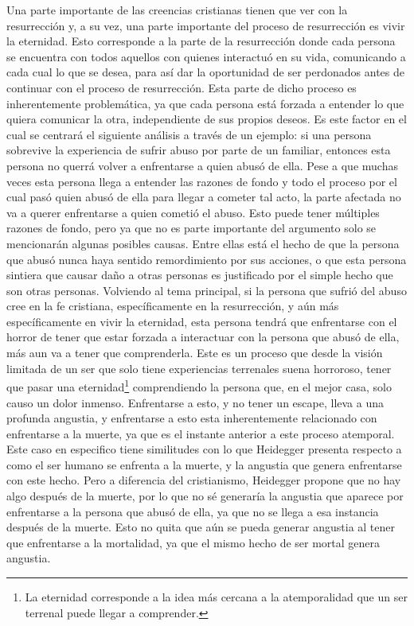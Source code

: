 \documentclass{homework}
\begin{document}
Una parte importante de las creencias cristianas tienen que ver con la resurrección y, a su vez, una parte importante del proceso de resurrección es vivir la eternidad. Esto corresponde a la parte de la resurrección donde cada persona se encuentra con todos aquellos con quienes interactuó en su vida, comunicando a cada cual lo que se desea, para así dar la oportunidad de ser perdonados antes de continuar con el proceso de resurrección. Esta parte de dicho proceso es inherentemente problemática, ya que cada persona está forzada a entender lo que quiera comunicar la otra, independiente de sus propios deseos. Es este factor en el cual se centrará el siguiente análisis a través de un ejemplo: si una persona sobrevive la experiencia de sufrir abuso por parte de un familiar, entonces esta persona no querrá volver a enfrentarse a quien abusó de ella. Pese a que muchas veces esta persona llega a entender las razones de fondo y todo el proceso por el cual pasó quien abusó de ella para llegar a cometer tal acto, la parte afectada no va a querer enfrentarse a quien cometió el abuso. Esto puede tener múltiples razones de fondo, pero ya que no es parte importante del argumento solo se mencionarán algunas posibles causas. Entre ellas está el hecho de que la persona que abusó nunca haya sentido remordimiento por sus acciones, o que esta persona sintiera que causar daño a otras personas es justificado por el simple hecho que son otras personas. Volviendo al tema principal, si la persona que sufrió del abuso cree en la fe cristiana, específicamente en la resurrección, y aún más específicamente en vivir la eternidad, esta persona tendrá que enfrentarse con el horror de tener que estar forzada a interactuar con la persona que abusó de ella, más aun va a tener que comprenderla. Este es un proceso que desde la visión limitada de un ser que solo tiene experiencias terrenales suena horroroso, tener que pasar una eternidad\footnote{La eternidad corresponde a la idea más cercana a la atemporalidad que un ser terrenal puede llegar a comprender.} comprendiendo la persona que, en el mejor casa, solo causo un dolor inmenso. Enfrentarse a esto, y no tener un escape, lleva a una profunda angustia, y enfrentarse a esto esta inherentemente relacionado con enfrentarse a la muerte, ya que es el instante anterior a este proceso atemporal. Este caso en especifico tiene similitudes con lo que Heidegger presenta respecto a como el ser humano se enfrenta a la muerte, y la angustia que genera enfrentarse con este hecho. Pero a diferencia del cristianismo, Heidegger propone que no hay algo después de la muerte, por lo que no sé generaría la angustia que aparece por enfrentarse a la persona que abusó de ella, ya que no se llega a esa instancia después de la muerte. Esto no quita que aún se pueda generar angustia al tener que enfrentarse a la mortalidad, ya que el mismo hecho de ser mortal genera angustia.
\end{document}
